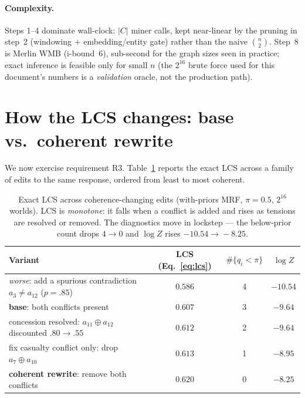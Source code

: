 \documentclass[11pt]{article}
\begin{document}
\paragraph{Complexity.} Steps 1--4 dominate wall-clock: $|C|$ miner calls, kept near-linear
by the pruning in step~2 (windowing $+$ embedding/entity gate) rather than the naive
$\binom n2$. Step~8 is Merlin WMB (i-bound~6), sub-second for the graph sizes seen in
practice; exact inference is feasible only for small $n$ (the $2^{16}$ brute force used for
this document's numbers is a \emph{validation} oracle, not the production path).

\section{How the LCS changes: base vs.\ coherent rewrite}
\label{sec:change}

We now exercise requirement R3. Table~\ref{tab:variants} reports the exact LCS across a
family of edits to the same response, ordered from least to most coherent.

\begin{table}[h]\centering\small
\renewcommand{\arraystretch}{1.1}
\begin{tabular}{@{}p{6.4cm}ccc@{}}
\toprule
\textbf{Variant} & \textbf{LCS} (Eq.~\ref{eq:lcs}) & \textbf{$\#\{q_i{<}\pi\}$} & \textbf{$\log Z$}\\
\midrule
\emph{worse}: add a spurious contradiction $a_3\!\neq\!a_{12}$ ($p{=}.85$) & $0.586$ & 4 & $-10.54$\\
\textbf{base}: both conflicts present                                       & $0.607$ & 3 & $-9.64$\\
concession resolved: $a_{11}\!\oplus\!a_{12}$ discounted $.80\!\to\!.55$      & $0.612$ & 2 & $-9.64$\\
fix casualty conflict only: drop $a_7\!\oplus\!a_{10}$                        & $0.613$ & 1 & $-8.95$\\
\textbf{coherent rewrite}: remove both conflicts                             & $0.620$ & 0 & $-8.25$\\
\bottomrule
\end{tabular}
\caption{Exact LCS across coherence-changing edits (with-priors MRF, $\pi{=}0.5$, $2^{16}$
worlds). LCS is \emph{monotone}: it falls when a conflict is added and rises as tensions
are resolved or removed. The diagnostics move in lockstep --- the below-prior count drops
$4\!\to\!0$ and $\log Z$ rises $-10.54\!\to\!-8.25$.}
\label{tab:variants}
\end{table}
\end{document}
